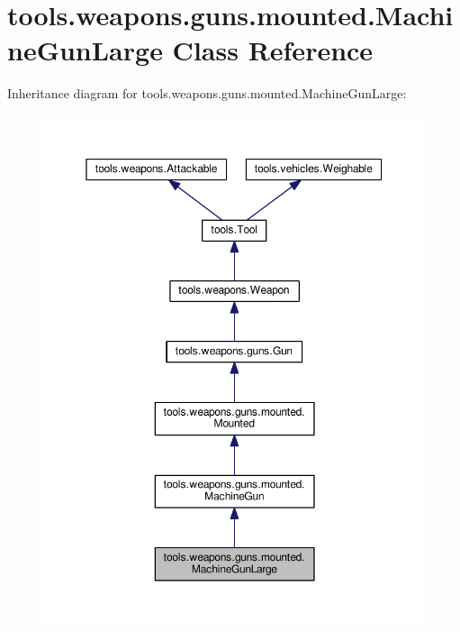 \hypertarget{classtools_1_1weapons_1_1guns_1_1mounted_1_1_machine_gun_large}{}\section{tools.\+weapons.\+guns.\+mounted.\+Machine\+Gun\+Large Class Reference}
\label{classtools_1_1weapons_1_1guns_1_1mounted_1_1_machine_gun_large}


Inheritance diagram for tools.\+weapons.\+guns.\+mounted.\+Machine\+Gun\+Large\+:
\nopagebreak
\begin{figure}[H]
\begin{center}
\leavevmode
\includegraphics[width=350pt]{classtools_1_1weapons_1_1guns_1_1mounted_1_1_machine_gun_large__inherit__graph}
\end{center}
\end{figure}


